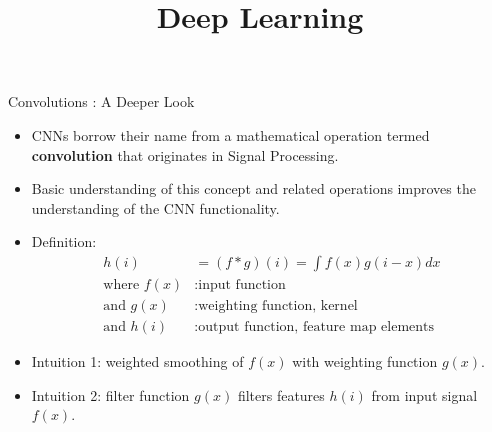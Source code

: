 




\newcommand{\titlefigure}{plots/xcorrel_animations/conv_xcorrel.png}
\newcommand{\learninggoals}{
  \item Convolution vs. Cross-Correlation
}

\title{Deep Learning}
\date{}






\begin{vbframe}{Convolutions : A Deeper Look}
    \begin{itemize}
        \item CNNs borrow their name from a mathematical operation termed \textbf{convolution} that originates in Signal Processing.
        \item Basic understanding of this concept and related operations improves the understanding of the CNN functionality.
    \end{itemize}
\framebreak
    \begin{itemize}
        \item Definition: \\
            \begin{equation*}
                \begin{split}
                    h(i) &= (f \ast g)(i) = \int f(x)g(i-x)dx \\
                    \text{where } f(x)&: \text{input function} \\
                    \text{and } g(x)&: \text{weighting function, kernel} \\
                    \text{and } h(i)&: \text{output function, feature map elements}
                \end{split}
            \end{equation*}
        \item Intuition 1: weighted smoothing of $f(x)$ with weighting function $g(x)$. 
        \item Intuition 2: filter function $g(x)$ filters features $h(i)$ from input signal $f(x)$.
    \end{itemize}
\end{vbframe}    

